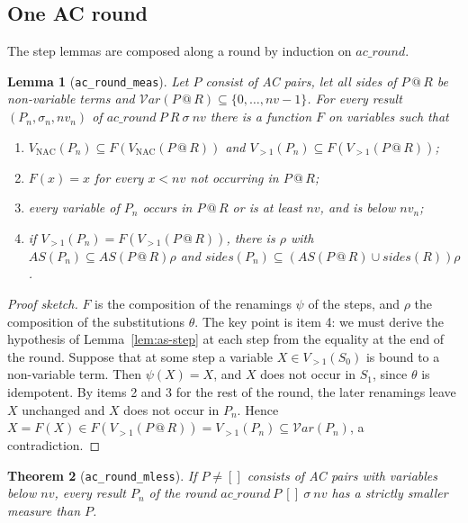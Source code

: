 \documentclass[11pt,a4paper]{article}
\newtheorem{theorem}{Theorem}[section]
\newtheorem{lemma}[theorem]{Lemma}
\theoremstyle{definition}
\theoremstyle{remark}
\newcommand{\isa}[1]{\mbox{\small\texttt{#1}}}
\newcommand{\vars}{\mathcal{V}\mathit{ar}}
\newcommand{\VNAC}{V_{\mathrm{NAC}}}
\newcommand{\Vtwo}{V_{>1}}
\newcommand{\AS}{\mathit{AS}}
\newcommand{\sides}{\mathit{sides}}
\begin{document}
\subsection{One AC round}

The step lemmas are composed along a round by induction on $\mathit{ac\_round}$.

\begin{lemma}[\isa{ac\_round\_meas}]
  Let $P$ consist of AC pairs, let all sides of $P \mathbin{@} R$ be non-variable terms and
  $\vars(P \mathbin{@} R) \subseteq \{0,\dots,\mathit{nv}-1\}$. For every result
  $(P_n, \sigma_n, \mathit{nv}_n)$ of $\mathit{ac\_round}\ P\ R\ \sigma\ \mathit{nv}$ there is a
  function $F$ on variables such that
  \begin{enumerate}[nosep]
    \item $\VNAC(P_n) \subseteq F(\VNAC(P \mathbin{@} R))$ and
          $\Vtwo(P_n) \subseteq F(\Vtwo(P \mathbin{@} R))$;
    \item $F(x) = x$ for every $x < \mathit{nv}$ not occurring in $P \mathbin{@} R$;
    \item every variable of $P_n$ occurs in $P \mathbin{@} R$ or is at least $\mathit{nv}$, and
          is below $\mathit{nv}_n$;
    \item if $\Vtwo(P_n) = F(\Vtwo(P \mathbin{@} R))$, there is $\rho$ with
          $\AS(P_n) \subseteq \AS(P \mathbin{@} R)\rho$ and
          $\sides(P_n) \subseteq (\AS(P \mathbin{@} R) \cup \sides(R))\rho$.
  \end{enumerate}
\end{lemma}

\begin{proof}[Proof sketch]
  $F$ is the composition of the renamings $\psi$ of the steps, and $\rho$ the composition of the
  substitutions $\theta$. The key point is item 4: we must derive the hypothesis of
  Lemma~\ref{lem:as-step} at each step from the equality at the end of the round. Suppose that at
  some step a variable $X \in \Vtwo(S_0)$ is bound to a non-variable term. Then $\psi(X) = X$, and
  $X$ does not occur in $S_1$, since $\theta$ is idempotent. By items 2 and 3 for the rest of the
  round, the later renamings leave $X$ unchanged and $X$ does not occur in $P_n$. Hence $X =
  F(X) \in F(\Vtwo(P \mathbin{@} R)) = \Vtwo(P_n) \subseteq \vars(P_n)$, a contradiction.
\end{proof}

\begin{theorem}[\isa{ac\_round\_mless}]
  If $P \neq []$ consists of AC pairs with variables below $\mathit{nv}$, every result $P_n$ of the
  round $\mathit{ac\_round}\ P\ []\ \sigma\ \mathit{nv}$ has a strictly smaller measure than $P$.
\end{theorem}
\end{document}
